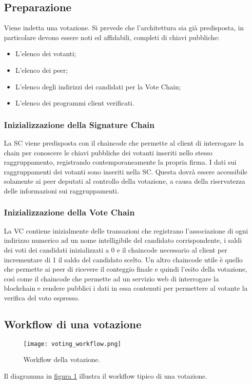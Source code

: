 	\subsection{Preparazione}
		Viene indetta una votazione. Si prevede che l'architettura sia già predisposta, in particolare devono essere noti ed affidabili, completi di chiavi pubbliche:
		\begin{itemize}
			\item L'elenco dei votanti;
			\item L'elenco dei peer;
			\item L'elenco degli indirizzi dei candidati per la Vote Chain;
			\item L'elenco dei programmi client verificati.
		\end{itemize}
		\subsubsection{Inizializzazione della Signature Chain}
			La SC viene predisposta con il chaincode che permette al client di interrogare la chain per conoscere le chiavi pubbliche dei votanti inseriti nello stesso raggruppamento, registrando contemporaneamente la propria firma. I dati sui raggruppamenti dei votanti sono inseriti nella SC. Questa dovrà essere accessibile solamente ai peer deputati al controllo della votazione, a causa della riservatezza delle informazioni sui raggruppamenti.
		\subsubsection{Inizializzazione della Vote Chain}
			La VC contiene inizialmente delle transazioni che registrano l'associazione di ogni indirizzo numerico ad un nome intelligibile del candidato corrispondente, i saldi dei voti dei candidati inizializzati a 0 e il chaincode necessario al client per incrementare di 1 il saldo del candidato scelto. Un altro chaincode utile è quello che permette ai peer di ricevere il conteggio finale e quindi l'esito della votazione, così come il chaincode che permette ad un servizio web di interrogare la blockchain e rendere pubblici i dati in essa contenuti per permettere al votante la verifica del voto espresso.
	
	\subsection{Workflow di una votazione}
		\begin{figure}[ht]
			\centering
			\texttt{[image: voting\_workflow.png]}
			\caption[Workflow della votazione]{Workflow della votazione.}
			\label{fig:voting_workflow}
		\end{figure}
		Il diagramma in \hyperref[fig:voting_workflow]{figura \ref*{fig:voting_workflow}} illustra il workflow tipico di una votazione.

